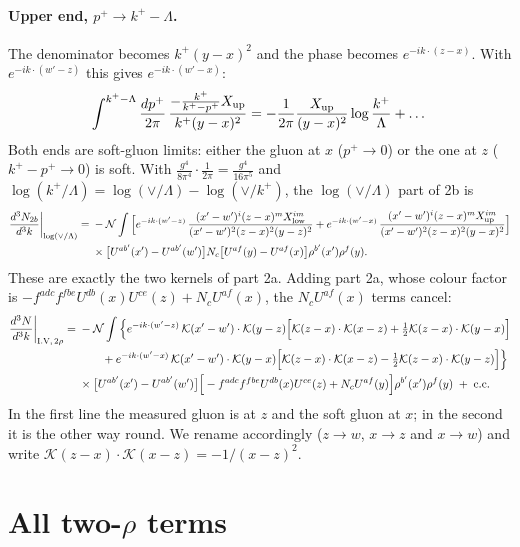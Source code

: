 \documentclass[10pt]{article}
\numberwithin{equation}{section}
\newcommand{\KK}{\mathcal K}
\newcommand{\NN}{\mathcal N}
\begin{document}
\paragraph{Upper end, $p^+\to k^+-\Lambda$.} The denominator becomes $k^+(y-x)^2$ and the phase becomes $e^{-ik\cdot(z-x)}$. With $e^{-ik\cdot(w'-z)}$ this gives $e^{-ik\cdot(w'-x)}$:
\begin{equation}
\int^{k^+-\Lambda}\frac{dp^+}{2\pi}\,\frac{-\frac{k^+}{k^+-p^+}X_{\rm up}}{k^+(y-x)^2}=-\frac1{2\pi}\frac{X_{\rm up}}{(y-x)^2}\log\frac{k^+}{\Lambda}+\dots
\end{equation}
Both ends are soft-gluon limits: either the gluon at $x$ ($p^+\to0$) or the one at $z$ ($k^+-p^+\to0$) is soft. With $\frac{g^4}{8\pi^4}\cdot\frac1{2\pi}=\frac{g^4}{16\pi^5}$ and $\log(k^+/\Lambda)=\log(\vee/\Lambda)-\log(\vee/k^+)$, the $\log(\vee/\Lambda)$ part of 2b is
\begin{align}
\frac{d^3N_{2b}}{d^3k}\bigg|_{\log(\vee/\Lambda)}={}&-\NN\int\Big[e^{-ik\cdot(w'-z)}\,\frac{(x'-w')^i(z-x)^m X^{im}_{\rm low}}{(x'-w')^2(z-x)^2(y-z)^2}+e^{-ik\cdot(w'-x)}\,\frac{(x'-w')^i(z-x)^m X^{im}_{\rm up}}{(x'-w')^2(z-x)^2(y-x)^2}\Big]\notag\\
&\times\big[U^{ab'}(x')-U^{ab'}(w')\big]N_c\big[U^{af}(y)-U^{af}(x)\big]\rho^{b'}(x')\rho^f(y).
\end{align}
These are exactly the two kernels of part 2a. Adding part 2a, whose colour factor is $-f^{adc}f^{fbe}U^{db}(x)U^{ce}(z)+N_cU^{af}(x)$, the $N_cU^{af}(x)$ terms cancel:
\begin{align}
\frac{d^3N}{d^3k}\bigg|_{\rm I.V,\,2\rho}={}&-\NN\int\Big\{e^{-ik\cdot(w'-z)}\,\KK(x'-w')\cdot\KK(y-z)\Big[\KK(z-x)\cdot\KK(x-z)+\tfrac12\KK(z-x)\cdot\KK(y-x)\Big]\notag\\
&\qquad+e^{-ik\cdot(w'-x)}\,\KK(x'-w')\cdot\KK(y-x)\Big[\KK(z-x)\cdot\KK(x-z)-\tfrac12\KK(z-x)\cdot\KK(y-z)\Big]\Big\}\notag\\
&\times\big[U^{ab'}(x')-U^{ab'}(w')\big]\Big[-f^{adc}f^{fbe}U^{db}(x)U^{ce}(z)+N_cU^{af}(y)\Big]\rho^{b'}(x')\rho^f(y)\;+\;{\rm c.c.}
\label{T:eq:rowV}
\end{align}
In the first line the measured gluon is at $z$ and the soft gluon at $x$; in the second it is the other way round. We rename accordingly ($z\to w$, $x\to z$ and $x\to w$) and write $\KK(z-x)\cdot\KK(x-z)=-1/(x-z)^2$.


\section{All two-\texorpdfstring{$\rho$}{rho} terms}\label{T:sec:all}
\end{document}
